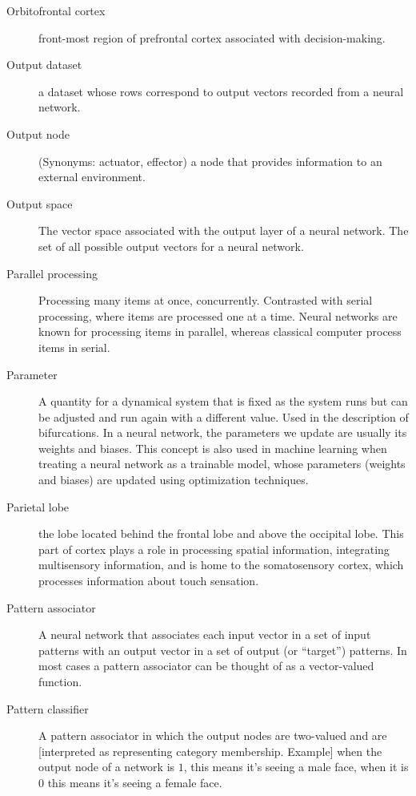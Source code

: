 \begin{description}
\item[Orbitofrontal cortex] front-most region of prefrontal cortex associated with decision-making.

\item[Output dataset] a dataset whose rows correspond to output vectors recorded from a neural network. 

\item[Output node] (Synonyms: actuator, effector) a node that provides information to an external environment. 

\item[Output space] The vector space associated with the output layer of a neural network. The set of all possible output vectors for a neural network.

\item[Parallel processing] Processing many items at once, concurrently. Contrasted with serial processing, where items are processed one at a time.  Neural networks are known for processing items in parallel, whereas classical computer process items in serial.

\item[Parameter] A quantity for a dynamical system that is fixed as the system runs but can be adjusted and run again with a different value. Used in the description of bifurcations. In a neural network, the parameters we  update are usually its weights and biases. This concept is also used in machine learning when treating a neural network as a trainable model, whose parameters (weights and biases) are updated using optimization techniques.

\item[Parietal lobe] the lobe located behind the frontal lobe and above the occipital lobe. This part of cortex plays a role in processing spatial information, integrating multisensory information, and is home to the somatosensory cortex, which processes information about touch sensation.

\item[Pattern associator] A neural network that associates each input vector in a set of input patterns with an output vector in a set of output (or ``target'') patterns. In most cases a pattern associator can be thought of as a vector-valued function. 
	

\item[Pattern classifier] A pattern associator in which the output nodes are two-valued and are [interpreted as representing category membership. Example] when the output node of a network is $1$, this means it's seeing a male face, when it is $0$ this means it's seeing a female face.


\end{description}
